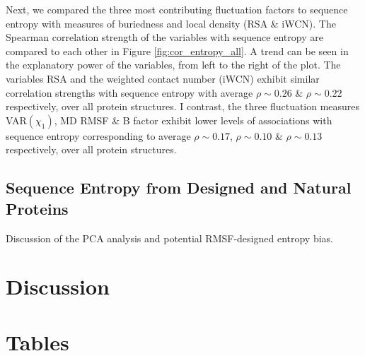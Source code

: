 \documentclass[12pt]{article}
\begin{document}
Next, we compared the three most contributing fluctuation factors to sequence entropy with measures of buriedness and local density (RSA \& iWCN). The Spearman correlation strength of the variables with sequence entropy are compared to each other in Figure \ref{fig:cor_entropy_all}. A trend can be seen in the explanatory power of the variables, from left to the right of the plot. The variables RSA and the weighted contact number (iWCN) exhibit similar correlation strengths with sequence entropy with average $\rho\sim0.26$ \& $\rho\sim0.22$ respectively, over all protein structures. I contrast, the three fluctuation measures VAR$(\chi_1)$, MD RMSF \& B factor exhibit lower levels of associations with sequence entropy corresponding to average $\rho\sim0.17$, $\rho\sim0.10$ \& $\rho\sim0.13$ respectively, over all protein structures.

\subsection*{Sequence Entropy from Designed and Natural Proteins}

            Discussion of the PCA analysis and potential RMSF-designed entropy bias.
	
    	
\section*{Discussion}





\newpage

\section*{Tables}
\end{document}
